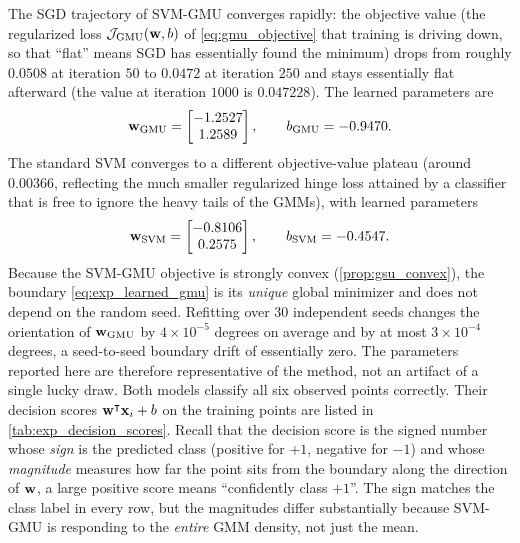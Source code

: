 \documentclass[11pt, letterpaper]{article}
\newcommand{\obj}{\mathcal{J}}
\begin{document}
The SGD trajectory of SVM-GMU converges rapidly: the objective value (the regularized loss $\obj_{\text{GMU}}(\vb{w}, b)$ of \cref{eq:gmu_objective} that training is driving down, so that ``flat'' means SGD has essentially found the minimum) drops from roughly $0.0508$ at iteration $50$ to $0.0472$ at iteration $250$ and stays essentially flat afterward (the value at iteration $1000$ is $0.047228$). The learned parameters are
\begin{equation}\label{eq:exp_learned_gmu}
    \vb{w}_{\text{GMU}} = \begin{bmatrix} -1.2527 \\  1.2589 \end{bmatrix},
    \qquad
    b_{\text{GMU}} = -0.9470.
\end{equation}
The standard SVM converges to a different objective-value plateau (around $0.00366$, reflecting the much smaller regularized hinge loss attained by a classifier that is free to ignore the heavy tails of the GMMs), with learned parameters
\begin{equation}\label{eq:exp_learned_svm}
    \vb{w}_{\text{SVM}} = \begin{bmatrix} -0.8106 \\  0.2575 \end{bmatrix},
    \qquad
    b_{\text{SVM}} = -0.4547.
\end{equation}
Because the SVM-GMU objective is strongly convex (\cref{prop:gsu_convex}), the boundary \cref{eq:exp_learned_gmu} is its \emph{unique} global minimizer and does not depend on the random seed. Refitting over $30$ independent seeds changes the orientation of $\vb{w}_{\text{GMU}}$ by $4\times10^{-5}$ degrees on average and by at most $3\times10^{-4}$ degrees, a seed-to-seed boundary drift of essentially zero. The parameters reported here are therefore representative of the method, not an artifact of a single lucky draw.
Both models classify all six observed points correctly. Their decision scores $\vb{w}^{\intercal}\vb{x}_i + b$ on the training points are listed in \cref{tab:exp_decision_scores}. Recall that the decision score is the signed number whose \emph{sign} is the predicted class (positive for $+1$, negative for $-1$) and whose \emph{magnitude} measures how far the point sits from the boundary along the direction of $\vb{w}$, a large positive score means ``confidently class $+1$''. The sign matches the class label in every row, but the magnitudes differ substantially because SVM-GMU is responding to the \emph{entire} GMM density, not just the mean.
\end{document}
